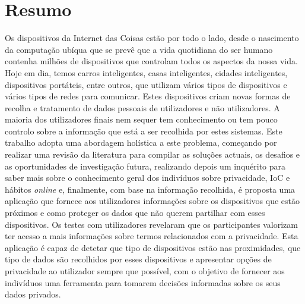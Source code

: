 %
%
\chapter*{Resumo}
\justify

Os dispositivos da Internet das Coisas estão por todo o lado, desde
o nascimento da computação ubíqua que se prevê que a vida quotidiana
do ser humano contenha milhões de dispositivos que controlam todos os
aspectos da nossa vida. Hoje em dia, temos carros inteligentes, casas
inteligentes, cidades inteligentes, dispositivos portáteis, entre
outros, que utilizam vários tipos de dispositivos e vários tipos de
redes para comunicar. Estes dispositivos criam novas formas de recolha
e tratamento de dados pessoais de utilizadores e não utilizadores.
A maioria dos utilizadores finais nem sequer tem conhecimento ou tem
pouco controlo sobre a informação que está a ser recolhida por
estes sistemas. Este trabalho adopta uma abordagem holística a este
problema, começando por realizar uma revisão da literatura para
compilar as soluções actuais, os desafios e as oportunidades de
investigação futura, realizando depois um inquérito para saber mais
sobre o conhecimento geral dos indivíduos sobre privacidade, IoC e
hábitos \textit{online} e, finalmente, com base na informação recolhida,
é proposta uma aplicação que fornece aos utilizadores informações
sobre os dispositivos que estão próximos e como proteger os dados
que não querem partilhar com esses dispositivos.
Os testes com utilizadores revelaram que os participantes valorizam
ter acesso a mais informações sobre termos relacionados com a privacidade.
Esta aplicação é capaz de detetar que tipo de dispositivos estão nas
proximidades, que tipo de dados são recolhidos por esses dispositivos
e apresentar opções de privacidade ao utilizador sempre que possível,
com o objetivo de fornecer aos indivíduos uma ferramenta para tomarem
decisões informadas sobre os seus dados privados.

